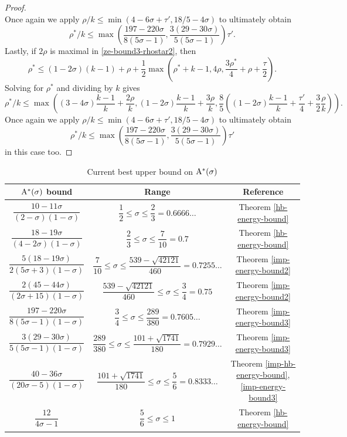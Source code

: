 \begin{proof}
\[\]
Once again we apply $\rho/k \le \min(4 - 6\sigma + \tau', 18/5 - 4\sigma)$ to ultimately obtain
\[
\rho^*/k \le \max\left(\frac{197 - 220\sigma}{8(5\sigma - 1)}, \frac{3(29 - 30\sigma)}{5(5\sigma - 1)}\right)\tau'.
\]
Lastly, if $2\rho$ is maximal in \eqref{ze-bound3-rhostar2}, then 
\[
\rho^* \le (1 - 2\sigma)(k - 1) + \rho + \frac{1}{2}\max(\rho^*+k - 1, 4\rho, \frac{3\rho^*}{4} + \rho+\frac{\tau}{2}).
\]
Solving for $\rho^*$ and dividing by $k$ gives
\[
\rho^*/k \le \max((3 - 4\sigma)\frac{k - 1}{k} + \frac{2\rho}{k}, (1 - 2\sigma)\frac{k - 1}{k} + \frac{3\rho}{k}, \frac{8}{5}((1 - 2\sigma)\frac{k - 1}{k} + \frac{\tau'}{4} + \frac{3}{2}\frac{\rho}{k})).
\]
Once again we apply $\rho/k \le \min(4 - 6\sigma + \tau', 18/5 - 4\sigma)$ to ultimately obtain
\[
\rho^*/k \le \max\left(\frac{197 - 220\sigma}{8(5\sigma - 1)}, \frac{3(29 - 30\sigma)}{5(5\sigma - 1)}\right)\tau'
\]
in this case too. 
\end{proof}


\begin{table}[ht]
    \def\arraystretch{2}
    \centering
    \caption{Current best upper bound on $\mathrm{A}^*(\sigma)$}
    \begin{tabular}{|c|c|c|}
    \hline
    $\mathrm{A}^*(\sigma)$ bound & Range & Reference\\
    \hline
    $\dfrac{10 - 11\sigma}{(2 - \sigma)(1 - \sigma)}$ & $\dfrac{1}{2} \leq \sigma \le \dfrac{2}{3} = 0.6666\ldots$ & Theorem \ref{hb-energy-bound}\\
    \hline
    $\dfrac{18 - 19\sigma}{(4 - 2\sigma)(1 - \sigma)}$ & $\dfrac{2}{3} \leq \sigma \le \dfrac{7}{10} = 0.7$ & Theorem \ref{hb-energy-bound}\\
    \hline
    $\dfrac{5(18 - 19\sigma)}{2(5\sigma + 3)(1 - \sigma)}$ & $\dfrac{7}{10} \leq \sigma \le \dfrac{539 - \sqrt{42121}}{460} = 0.7255\ldots$ & Theorem \ref{imp-energy-bound2}\\
    \hline
    $\dfrac{2(45 - 44\sigma)}{(2\sigma + 15)(1 - \sigma)}$ & $\dfrac{539 - \sqrt{42121}}{460} \leq \sigma \le \dfrac{3}{4} = 0.75$ & Theorem \ref{imp-energy-bound2}\\
    \hline
    $\dfrac{197 - 220\sigma}{8(5\sigma - 1)(1 - \sigma)}$ & $\dfrac{3}{4} \leq \sigma \le \dfrac{289}{380} = 0.7605\ldots$ & Theorem \ref{imp-energy-bound3}\\
    \hline
    $\dfrac{3(29 - 30\sigma)}{5(5\sigma - 1)(1 - \sigma)}$ & $\dfrac{289}{380} \leq \sigma \le \dfrac{101 + \sqrt{1741}}{180} = 0.7929\ldots$ & Theorem \ref{imp-energy-bound3}\\
    \hline
    $\dfrac{40 - 36\sigma}{(20\sigma - 5)(1 - \sigma)}$ & $\dfrac{101 + \sqrt{1741}}{180} \leq \sigma \le \dfrac{5}{6} = 0.8333\ldots$ & Theorem \ref{imp-hb-energy-bound}, \ref{imp-energy-bound3}\\
    \hline
    $\dfrac{12}{4\sigma - 1}$ & $\dfrac{5}{6} \leq \sigma \le 1$ & Theorem \ref{hb-energy-bound}\\
    \hline
    \end{tabular}
    \label{zero-density-energy-estimates-table}
\end{table}

